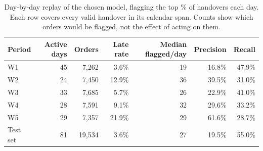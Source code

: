\begin{table}[H]
\centering\small
\caption{Day-by-day replay of the chosen model, flagging the top \ActShare{}\% of handovers each day. Each row covers every valid handover in its calendar span. Counts show which orders would be flagged, not the effect of acting on them.}
\label{tab:daily-replay}
\begin{tabular}{@{}lrrrrrr@{}}
\toprule
Period & Active days & Orders & Late rate & Median flagged/day & Precision & Recall \\
\midrule
W1 & 45 & 7,262 & 3.6\% & 19 & 16.8\% & 47.9\% \\
W2 & 24 & 7,450 & 12.9\% & 36 & 39.5\% & 31.0\% \\
W3 & 33 & 7,685 & 5.7\% & 26 & 22.9\% & 41.0\% \\
W4 & 28 & 7,591 & 9.1\% & 32 & 29.6\% & 33.2\% \\
W5 & 29 & 7,357 & 21.9\% & 29 & 61.6\% & 28.7\% \\
Test set & 81 & 19,534 & 3.6\% & 27 & 19.5\% & 55.0\% \\
\bottomrule
\end{tabular}
\end{table}
